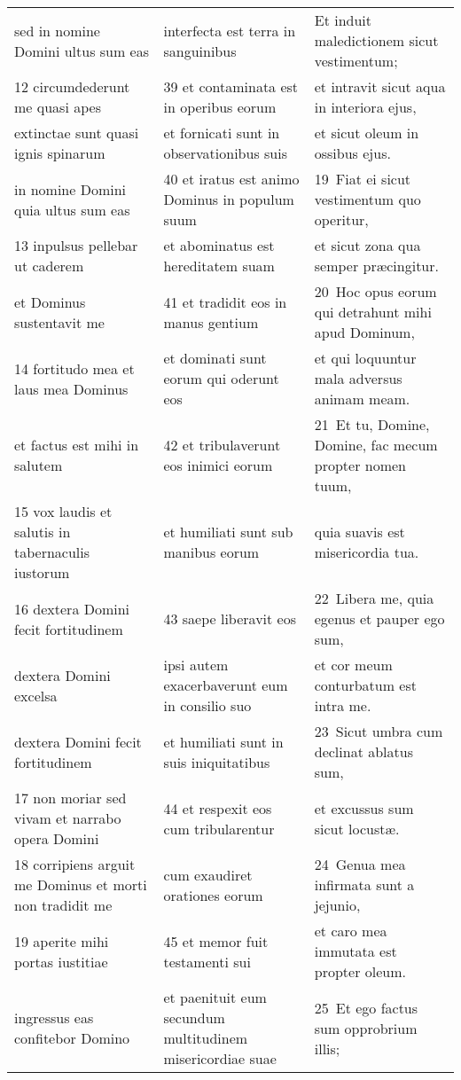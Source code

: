 \documentclass{article}
\begin{document}
\begin{longtable}{@{}p{}p{}p{}@{}}
sed in nomine Domini ultus sum eas	&	interfecta est terra in sanguinibus	&	Et induit maledictionem sicut vestimentum;	\\
12 circumdederunt me quasi apes	&	39 et contaminata est in operibus eorum	&	et intravit sicut aqua in interiora ejus,	\\
extinctae sunt quasi ignis spinarum	&	et fornicati sunt in observationibus suis	&	et sicut oleum in ossibus ejus.	\\
in nomine Domini quia ultus sum eas	&	40 et iratus est animo Dominus in populum suum	&	19 Fiat ei sicut vestimentum quo operitur,	\\
13 inpulsus pellebar ut caderem	&	et abominatus est hereditatem suam	&	et sicut zona qua semper præcingitur.	\\
et Dominus sustentavit me	&	41 et tradidit eos in manus gentium	&	20 Hoc opus eorum qui detrahunt mihi apud Dominum,	\\
14 fortitudo mea et laus mea Dominus	&	et dominati sunt eorum qui oderunt eos	&	et qui loquuntur mala adversus animam meam.	\\
et factus est mihi in salutem	&	42 et tribulaverunt eos inimici eorum	&	21 Et tu, Domine, Domine, fac mecum propter nomen tuum,	\\
15 vox laudis et salutis in tabernaculis iustorum	&	et humiliati sunt sub manibus eorum	&	quia suavis est misericordia tua.	\\
16 dextera Domini fecit fortitudinem	&	43 saepe liberavit eos	&	22 Libera me, quia egenus et pauper ego sum,	\\
dextera Domini excelsa	&	ipsi autem exacerbaverunt eum in consilio suo	&	et cor meum conturbatum est intra me.	\\
dextera Domini fecit fortitudinem	&	et humiliati sunt in suis iniquitatibus	&	23 Sicut umbra cum declinat ablatus sum,	\\
17 non moriar sed vivam et narrabo opera Domini	&	44 et respexit eos cum tribularentur	&	et excussus sum sicut locustæ.	\\
18 corripiens arguit me Dominus et morti non tradidit me	&	cum exaudiret orationes eorum	&	24 Genua mea infirmata sunt a jejunio,	\\
19 aperite mihi portas iustitiae	&	45 et memor fuit testamenti sui	&	et caro mea immutata est propter oleum.	\\
ingressus eas confitebor Domino	&	et paenituit eum secundum multitudinem misericordiae suae	&	25 Et ego factus sum opprobrium illis;	\\

\end{longtable}
\end{document}
